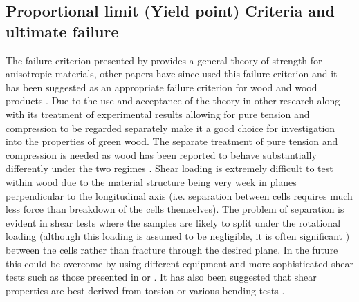 \documentclass[10pt]{article}
\begin{document}
\subsection{Proportional limit (Yield point) Criteria and ultimate failure}
\label{sec:TW}
The failure criterion presented by \citet{tsai_general_1971} provides a general theory of strength for anisotropic materials,
other papers have since used this failure criterion and it has been suggested as an appropriate failure criterion for wood and
wood products \citep{mackenzie-helnwein_rate-independent_2005,mackenzie-helnwein_analysis_2005}.
Due to the use and acceptance of the theory in other research along with its treatment of experimental results allowing for pure
tension and compression to be regarded separately make it a good choice for investigation into the properties of green wood.
The separate treatment of pure tension and compression is needed as wood has been reported to behave substantially differently
under the two regimes \citep{ozyhar_moisture-dependent_2013,bodig_jozsef_jayne_mechanics_1982}. Shear loading is extremely
difficult to test within wood due to the material structure being very week in planes perpendicular to the longitudinal axis
(i.e. separation between cells requires much less force than breakdown of the cells themselves). The problem of separation is
evident in shear tests where the samples are likely to split under the rotational loading (although this loading is assumed to
be negligible, it is often significant \citep{bodig_jozsef_jayne_mechanics_1982}) between the cells rather than fracture through
the desired plane. In the future this could be overcome by using different equipment and more sophisticated shear tests such as
those presented in \citep{bs_methods_1957} or  \citet{kollmann_f._cote_principles_1968}. It has also been suggested that shear
properties are best derived from torsion or various bending tests \citep{moden_micromechanics_2008}.
\end{document}
